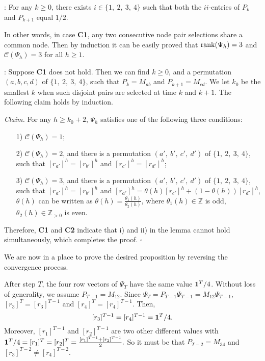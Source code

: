 \documentclass[a4paper, 11pt]{article}
\begin{document}
\medskip

: For any $k\geq 0$, there exists $i\in\{1,\ 2,\ 3,\ 4\}$ such that both the $ii$-entries of $P_k$ and $P_{k+1}$ equal $1/2$.

In other words, in case {\bf C1}, any two consecutive node pair selections share a common node. Then  by induction it can be easily proved  that  ${\rm rank}(\Psi_h)=3$ and $\mathscr{C}(\Psi_h)=3$ for all $h\geq 1$.

\medskip

: Suppose {\bf C1} does not hold. Then we can find $k\geq0$, and a permutation $(a, b, c, d)$ of $\{1,\ 2,\ 3,\ 4\}$, such that $P_k=M_{ab}$ and $P_{k+1}=M_{cd}$. We let $k_0$ be the smallest $k$ when such disjoint pairs are selected at time $k$ and $k+1$. The following claim holds by induction.

\medskip

{\it Claim.} For any $h\geq k_0+2$, $\Psi_h$ satisfies one of the following three conditions:
\begin{itemize}
\item[1)] $\mathscr{C}(\Psi_h)=1$;

\item [2)] $\mathscr{C}(\Psi_h)=2$, and there is a permutation $(a',\ b',\ c',\ d')$ of $\{1,\ 2,\ 3,\ 4\}$, such that $[{r}_{a'}]^h=[{r}_{b'}]^h$ and $[{r}_{c'}]^h=[{r}_{d'}]^h$;

\item [3)] $\mathscr{C}(\Psi_h)=3$, and there is a permutation $(a',\ b',\ c',\ d')$ of $\{1,\ 2,\ 3,\ 4\}$, such that $[{r}_{a'}]^h=[{r}_{b'}]^h$ and $[{r}_{a'}]^h=\theta(h)[{r}_{c'}]^h+(1-\theta(h))[{r}_{d'}]^h$, $\theta(h)$ can be written as $\theta(h)=\frac{\theta_1(h)}{\theta_2(h)}$, where $\theta_1(h)\in \mathds{Z}$ is odd, $\theta_2(h)\in \mathds{Z}_{> 0}$ is even.
\end{itemize}

\medskip


Therefore, {\bf C1} and {\bf C2} indicate that i) and ii) in the lemma cannot hold simultaneously, which completes the proof. \hfill$\square$



We are now in a place to prove the desired  proposition by reversing the convergence process.

After step $T$, the four row vectors of  $\Psi_T$ have the same value ${\bf{1}}^T/4$. Without loss of generality, we assume $P_{T-1}=M_{12}$. Since $\Psi_T=P_{T-1}\Psi_{T-1}=M_{12}\Psi_{T-1}$, $[{r}_3]^{T}=[{r}_3]^{T-1}$ and $[{r}_4]^{T}=[{r}_4]^{T-1}$. Then,
$$[{r}_3]^{T-1}=[{r}_4]^{T-1}={\bf{1}}^T/4.$$
Moreover, $[{r}_1]^{T-1}$ and $[{r}_2]^{T-1}$ are two other different values with
$
{\bf{1}}^T/4=[{r}_1]^{T}=[{r}_2]^{T}=\frac{[{r}_1]^{T-1}+[{r}_2]^{T-1}}{2}.
$
So it must be that $P_{T-2}=M_{34}$ and $[{r}_3]^{T-2}\neq [{r}_4]^{T-2}$.
\end{document}
